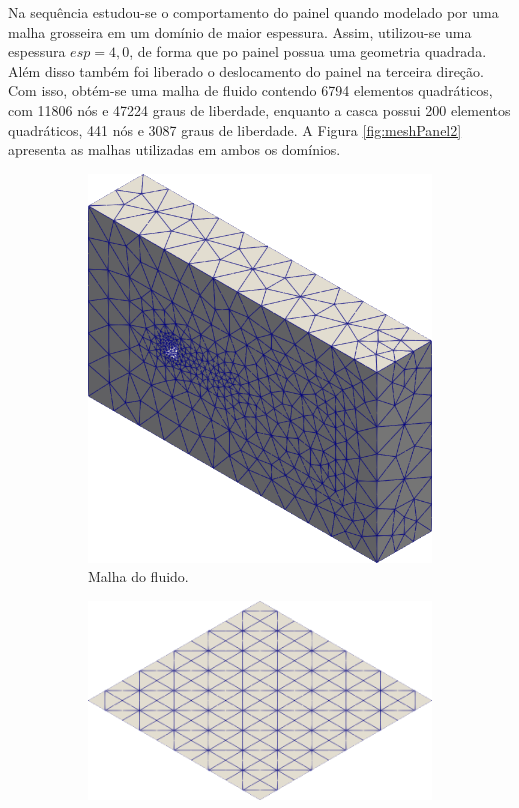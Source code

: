 Na sequência estudou-se o comportamento do painel quando modelado por uma malha grosseira em um domínio de maior espessura. Assim, utilizou-se uma espessura $esp=4,0$, de forma que po painel possua uma geometria quadrada. Além disso também foi liberado o deslocamento do painel na terceira direção. Com isso, obtém-se uma malha de fluido contendo 6794 elementos quadráticos, com 11806 nós e 47224 graus de liberdade, enquanto a casca possui 200 elementos quadráticos, 441 nós e 3087 graus de liberdade. A Figura \ref{fig:meshPanel2} apresenta as malhas utilizadas em ambos os domínios.

\begin{figure}[h!]
    \centering
    \caption{\textit{Flutter} em painel - Malha utilizada para os domínios da simulação de painel.}
    \begin{subfigure}[b]{0.49\textwidth}
        \includegraphics[width=\linewidth]{Figuras/flutter-coarse/fluid.png}
        \caption{Malha do fluido.}
    \end{subfigure}
    \begin{subfigure}[b]{0.49\textwidth}
        \includegraphics[width=\linewidth]{Figuras/flutter-coarse/shell.png}

\end{subfigure}
\end{figure}
